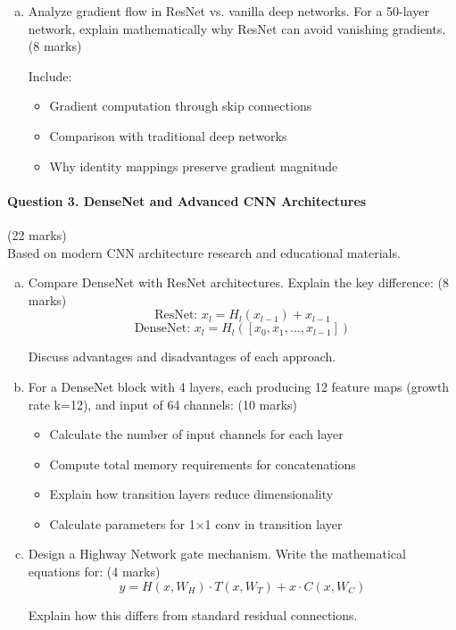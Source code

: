 \documentclass[12pt]{article}
\newcommand{\shortanswer}{\vspace{2cm}}
\newcommand{\mediumanswer}{\vspace{3cm}}
\newcommand{\journalspace}{\vspace{4.5cm}}
\begin{document}
\begin{enumerate}[(a)]
    \item Analyze gradient flow in ResNet vs. vanilla deep networks. For a 50-layer network, explain mathematically why ResNet can avoid vanishing gradients. \hfill (8 marks)
    
    Include:
    \begin{itemize}
        \item Gradient computation through skip connections
        \item Comparison with traditional deep networks
        \item Why identity mappings preserve gradient magnitude
    \end{itemize}
    
    \mediumanswer
\end{enumerate}

\newpage
\paragraph{Question 3. DenseNet and Advanced CNN Architectures}\hfill (22 marks)\\
Based on modern CNN architecture research and educational materials.

\begin{enumerate}[(a)]
    \item Compare DenseNet with ResNet architectures. Explain the key difference: \hfill (8 marks)
    $$\text{ResNet: } x_l = H_l(x_{l-1}) + x_{l-1}$$
    $$\text{DenseNet: } x_l = H_l([x_0, x_1, \ldots, x_{l-1}])$$
    
    Discuss advantages and disadvantages of each approach.
    
    \mediumanswer
    
    \item For a DenseNet block with 4 layers, each producing 12 feature maps (growth rate k=12), and input of 64 channels: \hfill (10 marks)
    \begin{itemize}
        \item Calculate the number of input channels for each layer
        \item Compute total memory requirements for concatenations
        \item Explain how transition layers reduce dimensionality
        \item Calculate parameters for 1×1 conv in transition layer
    \end{itemize}
    
    \journalspace
    
    \item Design a Highway Network gate mechanism. Write the mathematical equations for: \hfill (4 marks)
    $$y = H(x,W_H) \cdot T(x,W_T) + x \cdot C(x,W_C)$$
    
    Explain how this differs from standard residual connections.
    
    \shortanswer
\end{enumerate}
\end{document}
